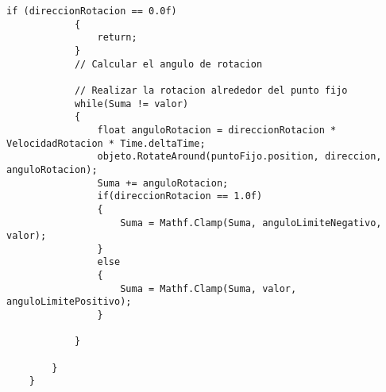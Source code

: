 \begin{lstlisting}[frame=single]
            if (direccionRotacion == 0.0f)
            {
                return;
            }
            // Calcular el angulo de rotacion
            
            // Realizar la rotacion alrededor del punto fijo
            while(Suma != valor)
            {
                float anguloRotacion = direccionRotacion * VelocidadRotacion * Time.deltaTime;
                objeto.RotateAround(puntoFijo.position, direccion, anguloRotacion);
                Suma += anguloRotacion;
                if(direccionRotacion == 1.0f)
                {
                    Suma = Mathf.Clamp(Suma, anguloLimiteNegativo, valor);
                }
                else
                {
                    Suma = Mathf.Clamp(Suma, valor, anguloLimitePositivo);
                }
                
            }
            
        }
    }
\end{lstlisting}